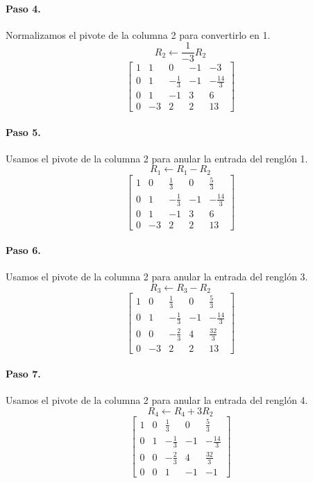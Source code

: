 \documentclass[12pt]{article}
\theoremstyle{remark}
\begin{document}
\paragraph{Paso 4.} Normalizamos el pivote de la columna 2 para convertirlo en 1.
\[
R_{2}\leftarrow \frac{1}{-3}R_{2}
\]
\[
\left[\begin{array}{cccc|c}
1 & 1 & 0 & -1 & -3\\
0 & 1 & - \frac{1}{3} & -1 & - \frac{14}{3}\\
0 & 1 & -1 & 3 & 6\\
0 & -3 & 2 & 2 & 13
\end{array}\right]
\]
\paragraph{Paso 5.} Usamos el pivote de la columna 2 para anular la entrada del renglón 1.
\[
R_{1}\leftarrow R_{1}-R_{2}
\]
\[
\left[\begin{array}{cccc|c}
1 & 0 & \frac{1}{3} & 0 & \frac{5}{3}\\
0 & 1 & - \frac{1}{3} & -1 & - \frac{14}{3}\\
0 & 1 & -1 & 3 & 6\\
0 & -3 & 2 & 2 & 13
\end{array}\right]
\]
\paragraph{Paso 6.} Usamos el pivote de la columna 2 para anular la entrada del renglón 3.
\[
R_{3}\leftarrow R_{3}-R_{2}
\]
\[
\left[\begin{array}{cccc|c}
1 & 0 & \frac{1}{3} & 0 & \frac{5}{3}\\
0 & 1 & - \frac{1}{3} & -1 & - \frac{14}{3}\\
0 & 0 & - \frac{2}{3} & 4 & \frac{32}{3}\\
0 & -3 & 2 & 2 & 13
\end{array}\right]
\]
\paragraph{Paso 7.} Usamos el pivote de la columna 2 para anular la entrada del renglón 4.
\[
R_{4}\leftarrow R_{4}+3R_{2}
\]
\[
\left[\begin{array}{cccc|c}
1 & 0 & \frac{1}{3} & 0 & \frac{5}{3}\\
0 & 1 & - \frac{1}{3} & -1 & - \frac{14}{3}\\
0 & 0 & - \frac{2}{3} & 4 & \frac{32}{3}\\
0 & 0 & 1 & -1 & -1
\end{array}\right]
\]
\end{document}
